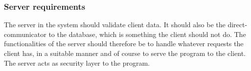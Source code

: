 \subsubsection{Server requirements}


The server in the system should validate client data. It should also be the direct-communicator to the database, which is something the client should not do. The functionalities of the server should therefore be to handle whatever requests the client has, in a suitable manner and of course to serve the program to the client. The server acts as security layer to the program.
